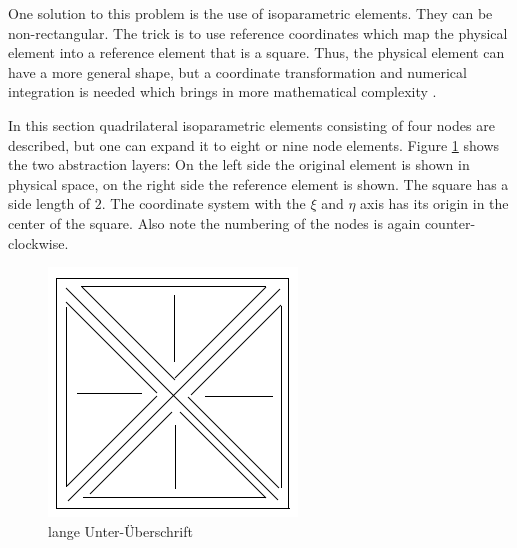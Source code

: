   One solution to this problem is the use of isoparametric elements. They can be non-rectangular. The trick is to use reference coordinates which map the physical element into a reference element that is a square. Thus, the physical element can have a more general shape, but a coordinate transformation and numerical integration is needed which brings in more mathematical complexity \cite{cook2002concepts}.
  
  In this section quadrilateral isoparametric elements consisting of four nodes are described, but one can expand it to eight or nine node elements. Figure \ref{fig:platzhalter} shows the two abstraction layers: On the left side the original element is shown in physical space, on the right side the reference element is shown. The square has a side length of $2$. The coordinate system with the $\xi$ and $\eta$ axis has its origin in the center of the square. Also note the numbering of the nodes is again counter-clockwise.
  \begin{figure}
  	\centering
  	\includegraphics[width=0.7\linewidth]{figures/platzhalter}
  	\caption[kurze Unter-Überschrift]{lange Unter-Überschrift}
  	\label{fig:platzhalter}
  \end{figure}
  
